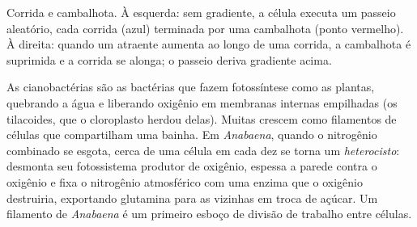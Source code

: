 \begin{omfigure}

{\small Corrida e cambalhota. À esquerda: sem gradiente, a célula
executa um passeio aleatório, cada corrida (azul) terminada por uma
cambalhota (ponto vermelho). À direita: quando um atraente aumenta ao
longo de uma corrida, a cambalhota é suprimida e a corrida se alonga;
o passeio deriva gradiente acima.}
\end{omfigure}

\begin{example}\label{ex:b2:unicellular-diversity:cyanobacteria}
As cianobactérias são as bactérias que fazem fotossíntese como as
plantas, quebrando a água e liberando oxigênio em membranas internas
empilhadas (os tilacoides, que o cloroplasto herdou delas). Muitas
crescem como filamentos de células que compartilham uma bainha. Em
\emph{Anabaena}, quando o nitrogênio combinado se esgota, cerca de uma
célula em cada dez se torna um \emph{heterocisto}: desmonta seu
fotossistema produtor de oxigênio, espessa a parede contra o oxigênio
e fixa o nitrogênio atmosférico com uma enzima que o oxigênio
destruiria, exportando glutamina para as vizinhas em troca de açúcar.
Um filamento de \emph{Anabaena} é um primeiro esboço de divisão de
trabalho entre células.
\end{example}


